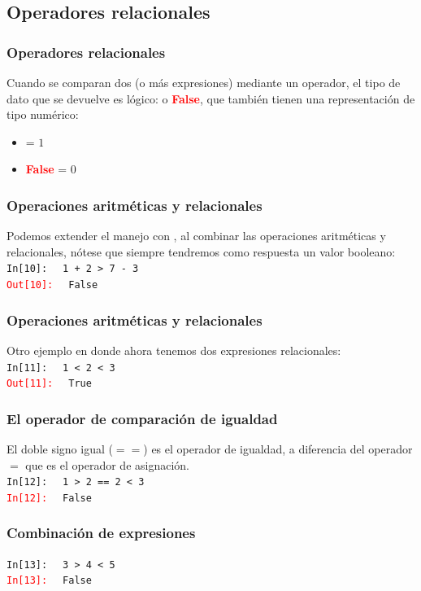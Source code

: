\documentclass[12pt]{beamer}
\begin{document}
{\subsection{Operadores relacionales}
\begin{frame}
\frametitle{Operadores relacionales}
Cuando se comparan dos (o más expresiones) mediante un operador, el tipo de dato que se devuelve es lógico:  o \textcolor{red}{\textbf{False}}, que también tienen una representación de tipo numérico:
\begin{itemize}
\item {} = $1$
\item \textcolor{red}{\textbf{False}} = $0$
\end{itemize}
\end{frame}
\begin{frame}[fragile]
\frametitle{Operaciones aritméticas y relacionales}
Podemos extender el manejo con \python, al combinar las operaciones aritméticas y relacionales, nótese que siempre tendremos como respuesta un valor booleano:
\\
\bigskip
\textcolor{ao}{\texttt{In[10]: }} \verb| 1 + 2 > 7 - 3| \\
\pause
\textcolor{red}{\texttt{Out[10]: }} \verb| False|
\end{frame}
\begin{frame}[fragile]
\frametitle{Operaciones aritméticas y relacionales}
Otro ejemplo en donde ahora tenemos dos expresiones relacionales:
\\
\bigskip
\textcolor{ao}{\texttt{In[11]: }} \verb| 1 < 2 < 3| \\
\pause
\textcolor{red}{\texttt{Out[11]: }} \verb| True|
\end{frame}
\begin{frame}[fragile]
\frametitle{El operador de comparación de igualdad}
El doble signo igual ($==$) es el operador de igualdad, a diferencia del operador $=$ que es el operador de asignación.
\\
\bigskip
\textcolor{ao}{\texttt{In[12]: }} \verb| 1 > 2 == 2 < 3| \\
\pause
\textcolor{red}{\texttt{In[12]: }} \verb| False|
\end{frame}
\begin{frame}[fragile]
\frametitle{Combinación de expresiones}
\textcolor{ao}{\texttt{In[13]: }} \verb| 3 > 4 < 5| \\
\pause
\textcolor{red}{\texttt{In[13]: }} \verb| False|
\\
\bigskip

\end{frame}}
\end{document}
